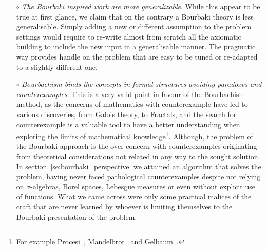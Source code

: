 \documentclass[]{scrartcl}
\theoremstyle{definition}
\begin{document}
\begin{itemize}
    The advocates of the superiority of \emph{pure mathematics}\footnote{
        And with another footnote, it is worth noticing here that the academic dichotomy pure/applied maths is something that can not be found in mathematics before Bourbaki. The reader is invited to classify any of the work of Archimedes, Gauss, Euler or any other great names in the history of pre-modern mathematics as \emph{pure} or \emph{applied} with no ambiguities.
    } have even arrived at accusing the mathematics that have anything to do with reality of being more prone of making mistakes\footnote{
        Gros~\cite{gros2019masters} had found how even professional mathematicians can be mislead by reality. And they had leveraged on this most surprising fact, for advocating to increase the detachment. After concluding that \lq\lq [...] we can't reason in a totally abstract manner\rq\rq, instead of suggesting to take into account the reality in the mathematical practice they suggested a move towards the opposite direction: \lq\lq We have to detach ourselves from our non-mathematical intuition\rq\rq~\cite{gros2019sciencedaily}.
    }. We can be reassured by the fact that under every circumstance, the reality is adamant to persist in being what it is, and it is at this point an interesting exercise to imagine someone advocating for having medicine and engineering detached from reality.

    \item[$\circ$] \emph{The Bourbaki inspired work are more generalizable}. While this appear to be true at first glance, we claim that on the contrary a Bourbaki theory is less generalisable. Simply adding a new or different assumption to the problem settings would require to re-write almost from scratch all the axiomatic building to include the new input in a generalisable manner. The pragmatic way provides handle on the problem that are easy to be tuned or re-adapted to a slightly different one.

    \item[$\circ$] \emph{Bourbachism binds the concepts in formal structures avoiding paradoxes and counterexamples}. This is a very valid point in favour of the Bourbachist method, as the concerns of mathematics with counterexample have led to various discoveries, from Galois theory, to Fractals, and the search for counterexample is a valuable tool to have a better understanding when exploring the limits of mathematical knowledge\footnote{
        For example Procesi~\cite{procesi1977elementi}, Mandelbrot~\cite{mandelbrot1983fractal} and Gelbaum~\cite{gelbaum2003counterexamples}.
    }. Although, the problem of the Bourbaki approach is the over-concern with counterexamples originating from theoretical considerations not related in any way to the sought solution. In section~\ref{se:bourbaki_perspective} we attained an algorithm that solves the problem, having never faced pathological counterexamples despite not relying on $\sigma$-algebras, Borel spaces, Lebesgue measures or even without explicit use of functions. What we came across were only some practical malices of the craft that are never learned by whoever is limiting themselves to the Bourbaki presentation of the problem.


\end{itemize}
\end{document}
